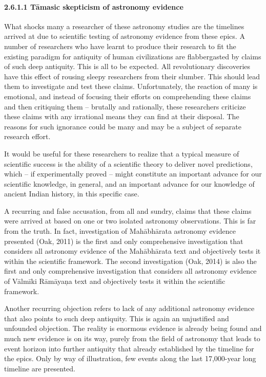\paragraph{2.6.1.1 Tāmasic skepticism of astronomy evidence}

What shocks many a researcher of these astronomy studies are the timelines arrived at due to scientific testing of astronomy evidence from these epics. A number of researchers who have learnt to produce their research to fit the existing paradigm for antiquity of human civilizations are flabbergasted by claims of such deep antiquity. This is all to be expected. All revolutionary discoveries have this effect of rousing sleepy researchers from their slumber. This should lead them to investigate and test these claims. Unfortunately, the reaction of many is emotional, and instead of focusing their efforts on comprehending these claims and then critiquing them – brutally and rationally, these researchers criticize these claims with any irrational means they can find at their disposal. The reasons for such ignorance could be many and may be a subject of separate research effort.

It would be useful for these researchers to realize that a typical measure of scientific success is the ability of a scientific theory to deliver novel predictions, which – if experimentally proved – might constitute an important advance for our scientific knowledge, in general, and an important advance for our knowledge of ancient Indian history, in this specific case.

A recurring and false accusation, from all and sundry, claims that these claims were arrived at based on one or two isolated astronomy observations. This is far from the truth. In fact, investigation of Mahābhārata astronomy evidence presented (Oak, 2011) is the first and only comprehensive investigation that considers all astronomy evidence of the Mahābhārata text and objectively tests it within the scientific framework. The second investigation (Oak, 2014) is also the first and only comprehensive investigation that considers all astronomy evidence of Vālmīki Rāmāyaņa text and objectively tests it within the scientific framework.

Another recurring objection refers to lack of any additional astronomy evidence that also points to such deep antiquity. This is again an unjustified and unfounded objection. The reality is enormous evidence is already being found and much new evidence is on its way, purely from the field of astronomy that leads to event horizon into further antiquity that already established by the timeline for the epics. Only by way of illustration, few events along the last 17,000-year long timeline are presented.


